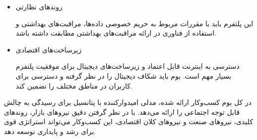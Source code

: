 \documentclass[dvipsnames, svgnames, x11names, 11pt]{article}
\begin{document}
\begin{enumerate}
\begin{itemize}
\item
روندهای نظارتی

این پلتفرم باید با مقررات مربوط به حریم خصوصی داده‌ها، مراقبت‌های بهداشتی و استفاده از فناوری در ارائه مراقبت‌های بهداشتی مطابقت داشته باشد.

\item
زیرساخت‌های اقتصادی

دسترسی به اینترنت قابل اعتماد و زیرساخت‌های دیجیتال برای موفقیت پلتفرم بسیار مهم است. بوم باید شکاف دیجیتال را در نظر گرفته و دسترسی برای کاربران در مناطق مختلف را تضمین کند.
\end{itemize}
\end{enumerate}
در کل بوم کسب‌وکار ارائه شده، مدلی امیدوارکننده با پتانسیل برای رسیدگی به چالش قابل توجه اجتماعی را ارائه می‌دهد. با در نظر گرفتن دقیق نیروهای بازار، روندهای کلیدی، نیروهای صنعت و نیروهای کلان اقتصادی، این کسب‌وکار می‌تواند استراتژی قوی برای رشد و پایداری توسعه دهد.
\end{document}
